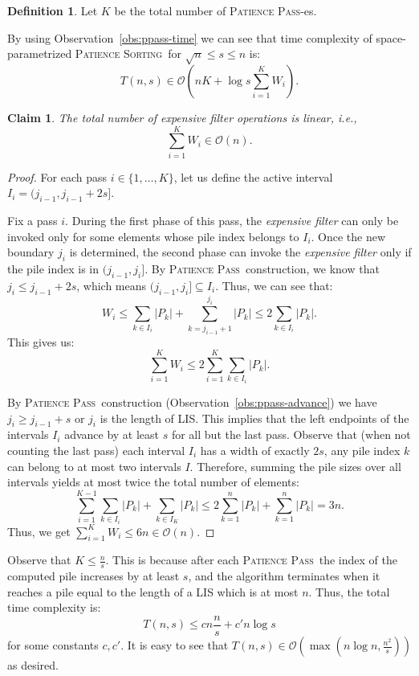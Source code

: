 \documentclass[lic, english, shortabstract]{iithesis}
\theoremstyle{plain}
\newcommand{\Lis}{\textsc{LIS}}
\newcommand{\Psort}{\textsc{Patience Sorting}}
\newcommand{\Ppass}{\textsc{Patience Pass}}
\newtheorem{claim}[theorem]{Claim}
\theoremstyle{definition}
\newtheorem{definition}{Definition}[section]
\begin{document}
\begin{definition}
Let $K$ be the total number of \Ppass -es.
\end{definition}

By using Observation~\ref{obs:ppass-time} we can see that time complexity of space-parametrized \Psort\ for $\sqrt{n} \leq s \leq n$ is:
\[
T(n,s) \in \mathcal{O}(nK + \log s \sum_{i=1}^K W_i).
\]

\begin{claim} \label{claim:linear-filters}
The total number of expensive filter operations is linear, i.e.,
\[
\sum_{i=1}^K W_i \in \mathcal{O}(n).
\]
\end{claim}

\begin{proof}
For each pass $i \in \{1, \dots, K\}$, let us define the active interval $I_i = (j_{i-1}, j_{i-1}+2s]$.

Fix a pass $i$. During the first phase of this pass, the \textit{expensive filter} can only be invoked only for some elements whose pile index belongs to $I_i$.
Once the new boundary $j_i$ is determined, the second phase can invoke the \textit{expensive filter} only if the pile index is in $(j_{i-1}, j_i]$. 
By \Ppass\ construction, we know that $j_i \leq j_{i-1} + 2s$, which means $(j_{i-1}, j_i] \subseteq I_i$. Thus, we can see that:
\[
W_i \le \sum_{k \in I_i} |P_k| + \sum_{k=j_{i-1}+1}^{j_i} |P_k| \leq 2\sum_{k \in I_i} |P_k|.
\]
This gives us: 
\[
\sum_{i=1}^K W_i \le 2\sum_{i=1}^K \sum_{k \in I_i} |P_k|.
\]

By \Ppass\ construction (Observation~\ref{obs:ppass-advance}) we have $j_i \ge j_{i-1}+s$  or $j_i$ is the length of \Lis.
This implies that the left endpoints of the intervals $I_i$ advance by at least $s$ for all but the last pass.
Observe that (when not counting the last pass) each interval $I_i$ has a width of exactly $2s$, any pile index $k$ can belong to at most two intervals $I$.
Therefore, summing the pile sizes over all intervals yields at most twice the total number of elements:
\[
\sum_{i=1}^{K-1} \sum_{k \in I_i} |P_k| + \sum_{k \in I_K} |P_k| \le 2\sum_{k=1}^n |P_k| + \sum_{k=1}^n |P_k|  = 3n.
\]
Thus, we get $\sum_{i=1}^K W_i \le 6n \in \mathcal{O}(n)$.
\end{proof}

Observe that $K \leq \frac{n}{s}$. 
This is because after each \Ppass\ the index of the computed pile increases by at least $s$, and
the algorithm terminates when it reaches a pile equal to the length of a LIS which is at most $n$.
Thus, the total time complexity is:
\[
T(n,s) \leq cn \frac{n}{s} + c'n\log s
\]
for some constants $c, c'$. It is easy to see that $T(n, s) \in \mathcal{O}(\max(n\log n, \frac{n^2}{s}))$ as desired.
\end{document}
